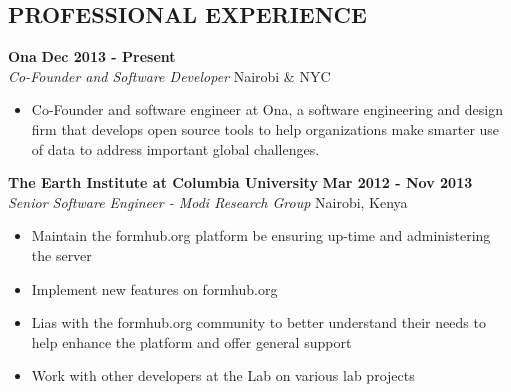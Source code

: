 \documentclass{res}
\begin{document}
\thispagestyle{empty} %

\address{ P.O. Box 14631 - 00100 \\   Nairobi, Kenya \\ +254.720.417.691}      
                                      
\address{larryweya@ona.io}

\begin{resume}
 
\section{PROFESSIONAL EXPERIENCE} 

\vspace{8pt}
\textbf{Ona} \hfill        \textbf{Dec 2013 - Present} \\
\emph{Co-Founder and Software Developer}       \hfill   Nairobi \& NYC

\begin{itemize} \itemsep -2pt %
	\item Co-Founder and software engineer at Ona, a software engineering and design firm that develops open source tools to help organizations make smarter use of data to address important global challenges.

 \end{itemize} \vspace{-4pt}

\vspace{8pt}
\textbf{The Earth Institute at Columbia University} \hfill        \textbf{Mar 2012 - Nov 2013} \\
\emph{Senior Software Engineer - Modi Research Group}       \hfill   Nairobi, 
Kenya

\begin{itemize} \itemsep -2pt %
        \item Maintain the formhub.org platform be ensuring up-time and 
        administering the server
        \item Implement new features on formhub.org
        \item Lias with the formhub.org community to better understand their 
        needs to help enhance the platform and offer general support
        \item Work with other developers at the Lab on various lab projects
 \end{itemize} \vspace{-4pt}


\end{resume}
\end{document}
